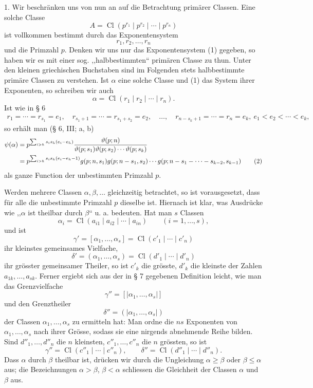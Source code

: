 \documentclass[11pt,a4paper]{article}
\newcommand{\Cl}{\operatorname{Cl}}
\begin{document}
1. Wir beschränken uns von nun an auf die Betrachtung primärer Classen. Eine solche Classe
\[
 A=\Cl(p^{r_1}\mid p^{r_2}\mid\cdots\mid p^{r_n})
\]
ist vollkommen bestimmt durch das Exponentensystem
\begin{equation}
 r_1,r_2,\ldots,r_n
\tag{1}
\end{equation}
und die Primzahl $p$. Denken wir uns nur das Exponentensystem (1) gegeben, so haben wir es mit einer sog. ,,halbbestimmten`` primären Classe zu thun. Unter den kleinen griechischen Buchstaben sind im Folgenden stets halbbestimmte primäre Classen zu verstehen. Ist $\alpha$ eine solche Classe und (1) das System ihrer Exponenten, so schreiben wir auch
\[
 \alpha=\Cl(r_1\mid r_2\mid\cdots\mid r_n).
\]
Ist wie in § 6
\[
\begin{gathered}
 r_1=\cdots=r_{s_1}=e_1,
 \quad r_{s_1+1}=\cdots=r_{s_1+s_2}=e_2,
 \quad \ldots,\quad
 r_{n-s_k+1}=\cdots=r_n=e_k,\
 e_1<e_2<\cdots<e_k,
\end{gathered}
\]
so erhält man (§ 6, III; a, b)
\begin{align}
\psi(\alpha)
&=p^{\sum_{i>h}s_i s_h(e_i-e_h)}
 {\vartheta(p;n)\over \vartheta(p;s_1)\vartheta(p;s_2)\cdots\vartheta(p;s_k)} \notag\\
&=p^{\sum_{i>h}s_i s_h(e_i-e_h-1)}
 g(p;n,s_1)g(p;n-s_1,s_2)\cdots
 g(p;n-s_1-\cdots-s_{k-2},s_{k-1})
\tag{2}
\end{align}
als ganze Function der unbestimmten Primzahl $p$.

Werden mehrere Classen $\alpha,\beta,\ldots$ gleichzeitig betrachtet, so ist vorausgesetzt, dass für alle die unbestimmte Primzahl $p$ dieselbe ist. Hiernach ist klar, was Ausdrücke wie ,,$\alpha$ ist theilbar durch $\beta$`` u. a. bedeuten. Hat man $s$ Classen
\[
 \alpha_i=\Cl(a_{i1}\mid a_{i2}\mid\cdots\mid a_{in})\qquad (i=1,\ldots,s),
\]
und ist
\[
 \gamma'=[\alpha_1,\ldots,\alpha_s]=\Cl(c'_1\mid\cdots\mid c'_n)
\]
ihr kleinstes gemeinsames Vielfache,
\[
 \delta'=(\alpha_1,\ldots,\alpha_s)=\Cl(d'_1\mid\cdots\mid d'_n)
\]
ihr grösster gemeinsamer Theiler, so ist $c'_k$ die grösste, $d'_k$ die kleinste der Zahlen $a_{1k},\ldots,a_{sk}$. Ferner ergiebt sich aus der in § 7 gegebenen Definition leicht, wie man das Grenzvielfache
\[
 \gamma''=[|\alpha_1,\ldots,\alpha_s|]
\]
und den Grenztheiler
\[
 \delta''=(|\alpha_1,\ldots,\alpha_s|)
\]
der Classen $\alpha_1,\ldots,\alpha_s$ zu ermitteln hat: Man ordne die $ns$ Exponenten von $\alpha_1,\ldots,\alpha_s$ nach ihrer Grösse, sodass sie eine nirgends abnehmende Reihe bilden. Sind $d''_1,\ldots,d''_n$ die $n$ kleinsten, $c''_1,\ldots,c''_n$ die $n$ grössten, so ist
\[
 \gamma''=\Cl(c''_1\mid\cdots\mid c''_n),\qquad
 \delta''=\Cl(d''_1\mid\cdots\mid d''_n).
\]
Dass $\alpha$ durch $\beta$ theilbar ist, drücken wir durch die Ungleichung $\alpha\ge\beta$ oder $\beta\le\alpha$ aus; die Bezeichnungen $\alpha>\beta$, $\beta<\alpha$ schliessen die Gleichheit der Classen $\alpha$ und $\beta$ aus.
\end{document}
